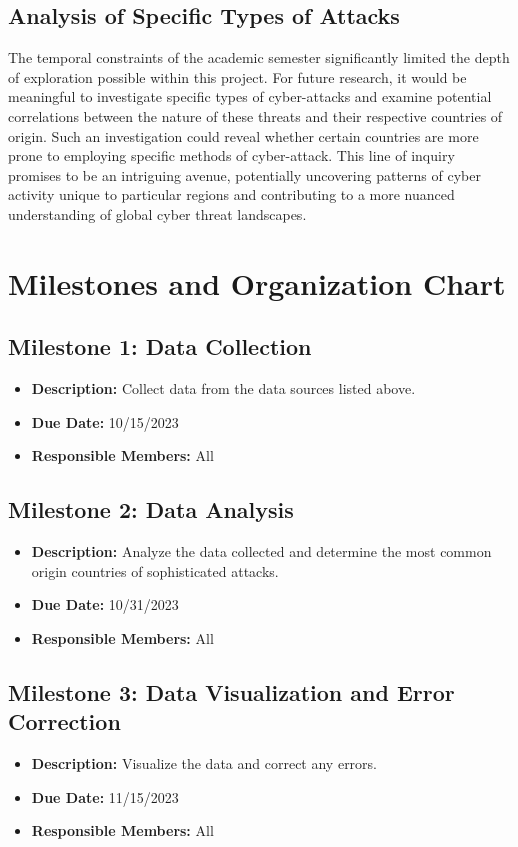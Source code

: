 \documentclass[letterpaper, 10 pt, conference]{ieeeconf}  %
\begin{document}
\subsection*{Analysis of Specific Types of Attacks}
The temporal constraints of the academic semester significantly limited the depth of exploration possible within this project. For future research, it would be meaningful to investigate specific types of cyber-attacks and examine potential correlations between the nature of these threats and their respective countries of origin. Such an investigation could reveal whether certain countries are more prone to employing specific methods of cyber-attack. This line of inquiry promises to be an intriguing avenue, potentially uncovering patterns of cyber activity unique to particular regions and contributing to a more nuanced understanding of global cyber threat landscapes.

\section{Milestones and Organization Chart}

    \subsection*{Milestone 1: Data Collection}
    \begin{itemize}
        \item \textbf{Description:} Collect data from the data sources listed above.
        \item \textbf{Due Date:} 10/15/2023
        \item \textbf{Responsible Members:} All
    \end{itemize}
    \subsection*{Milestone 2: Data Analysis}
    \begin{itemize}
        \item \textbf{Description:} Analyze the data collected and determine the most common origin countries of sophisticated attacks.
        \item \textbf{Due Date:} 10/31/2023
        \item \textbf{Responsible Members:} All
    \end{itemize}
    \subsection*{Milestone 3: Data Visualization and Error Correction}
    \begin{itemize}
        \item \textbf{Description:} Visualize the data and correct any errors.
        \item \textbf{Due Date:} 11/15/2023
        \item \textbf{Responsible Members:} All

    \end{itemize}
\end{document}
